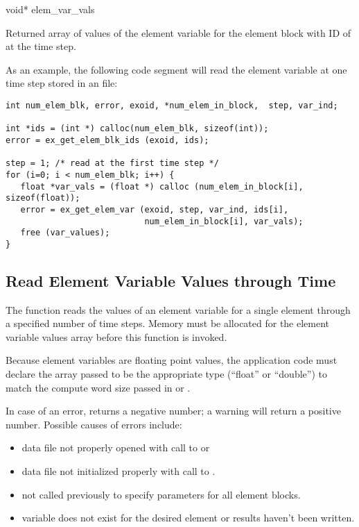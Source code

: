 {void* elem_var_vals \W{}}


Returned array of  values of the \th{}
element variable for the element block with ID of 
at the \th{} time step.


As an example, the following code segment will read the
\th{} element variable at one time step stored in an
\exo{} file:

\begin{lstlisting}
int num_elem_blk, error, exoid, *num_elem_in_block,  step, var_ind;

int *ids = (int *) calloc(num_elem_blk, sizeof(int));
error = ex_get_elem_blk_ids (exoid, ids);

step = 1; /* read at the first time step */
for (i=0; i < num_elem_blk; i++) {
   float *var_vals = (float *) calloc (num_elem_in_block[i], sizeof(float));
   error = ex_get_elem_var (exoid, step, var_ind, ids[i],
                            num_elem_in_block[i], var_vals);
   free (var_values);
}
\end{lstlisting}


\subsection{Read Element Variable Values through Time}

The function  reads the values of an
element variable for a single element through a specified number of
time steps. Memory must be allocated for the element variable values
array before this function is invoked.

Because element variables are floating point values, the application
code must declare the array passed to be the appropriate type
(``float'' or ``double'') to match the compute word size passed in
 or .

In case of an error,  returns a
negative number; a warning will return a positive number. Possible
causes of errors include:

\begin{itemize}
 \item data file not properly opened with call to 
 or 

 \item data file not initialized properly with call to .

 \item {} not called previously to specify
 parameters for all element blocks.

 \item variable does not exist for the desired element or results
 haven't been written.
\end{itemize}



